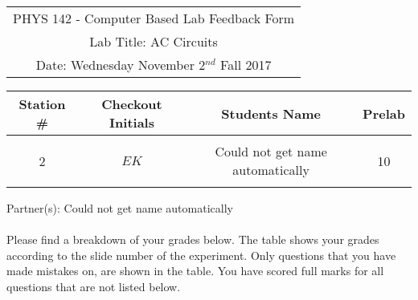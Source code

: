 \documentclass{article}
\begin{document}

\begin{table}[h]
	\centering
	\begin{tabular}{c}
	PHYS 142 - Computer Based Lab Feedback Form\\
	Lab Title: AC Circuits\\Date: Wednesday November 2$^{nd}$ Fall 2017 \\\hline
\end{tabular}
\end{table}
\begin{table}[h]\centering \begin{tabular}{|c|c|p{9.9 cm}|c|}\hline Station \#  & Checkout Initials & \multicolumn{1}{|c|}{Students Name} & Prelab \\\hline\multirow{3}{*}{2}& \multirow{3}{*}{$EK$} & &\\& &\multicolumn{1}{|c|}{Could not get name automatically}&10\\&   &  &\\\hline
\end{tabular}
\end{table}
Partner(s): Could not get name automatically\\
\\Please find a breakdown of your grades below. The table shows your grades according to the slide number of the experiment. Only questions that you have made mistakes on, are shown in the table. You have scored full marks for all questions that are not listed below.
\end{document}
